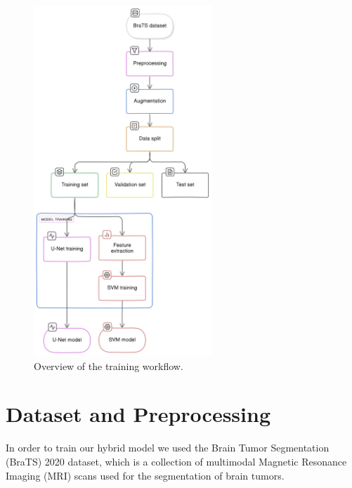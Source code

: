 \begin{figure}[H]
  \centering
  \includegraphics[width=0.6\textwidth]{Images/Chapter3/training.png}
  \caption{Overview of the training workflow.}
  \label{fig:training}
\end{figure}

\section{Dataset and Preprocessing}
\label{sec:contribution-dataset}
In order to train our hybrid model we used the Brain Tumor Segmentation (BraTS) 2020 dataset, which is a collection of multimodal Magnetic Resonance Imaging (MRI) scans used for the segmentation of brain tumors.

